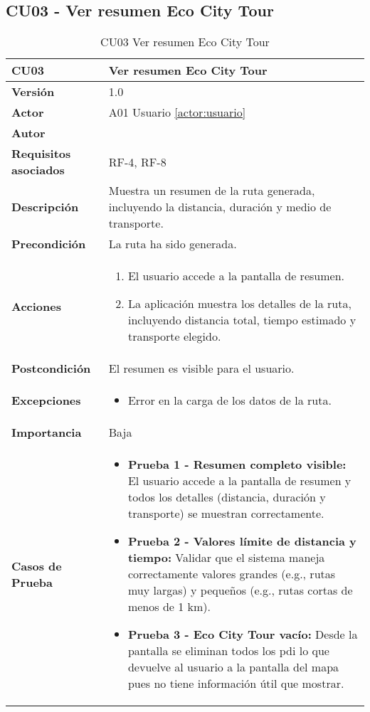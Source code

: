 \subsection{CU03 - Ver resumen Eco City Tour}
\begin{table}[H]
	\centering
	\begin{tabularx}{\linewidth}{ p{} p{} }
		\toprule
		\textbf{CU03}    & \textbf{Ver resumen Eco City Tour} \\
		\toprule
		\textbf{Versión}              & 1.0    \\
		\textbf{Actor}                & A01 Usuario \ref{actor:usuario} \\
		\textbf{Autor}                & \autor \\
		\textbf{Requisitos asociados} & RF-4, RF-8 \\
		\textbf{Descripción}          & Muestra un resumen de la ruta generada, incluyendo la distancia, duración y medio de transporte. \\
		\textbf{Precondición}         & La ruta ha sido generada. \\
		\textbf{Acciones}             &
		\begin{enumerate}
			\def\labelenumi{\arabic{enumi}.}
			\tightlist
			\item El usuario accede a la pantalla de resumen.
			\item La aplicación muestra los detalles de la ruta, incluyendo distancia total, tiempo estimado y transporte elegido.
		\end{enumerate}\\
		\textbf{Postcondición}        & El resumen es visible para el usuario. \\
		\textbf{Excepciones}          & 
		\begin{itemize}
			\tightlist
			\item Error en la carga de los datos de la ruta.
		\end{itemize}\\
		\textbf{Importancia}          & Baja \\
		\textbf{Casos de Prueba}      &
		\begin{itemize}
			\item \textbf{Prueba 1 - Resumen completo visible:} El usuario accede a la pantalla de resumen y todos los detalles (distancia, duración y transporte) se muestran correctamente.
			\vspace{2pt}
			\item \textbf{Prueba 2 - Valores límite de distancia y tiempo:} Validar que el sistema maneja correctamente valores grandes (e.g., rutas muy largas) y pequeños (e.g., rutas cortas de menos de 1 km).
			\vspace{2pt}
			\item \textbf{Prueba 3 - Eco City Tour vacío:} Desde la pantalla se eliminan todos los \acrshort{pdi} lo que devuelve al usuario a la pantalla del mapa pues no tiene información útil que mostrar.
		\end{itemize} \\
		\bottomrule
	\end{tabularx}
	\caption{CU03 Ver resumen Eco City Tour}
	\label{cu:resumen}
\end{table}


